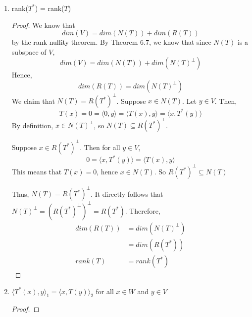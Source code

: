 \documentclass[11pt]{scrartcl}
\begin{document}
\begin{enumerate}[label=\alph*.]
{\begin{proof}
		      \begin{align*}
			      (B_{ij})^* & = \overline{B_{ji}}                         \\
			                 & =  \overline{\langle T(v_i), w_j \rangle_2} \\
			                 & =  \langle w_j, T(v_i) \rangle_2            \\
			                 & = \langle T^*(w_j), v_i \rangle_1           \\
			                 & = A_{ij}
		      \end{align*}
		      Therfore, $\left[\mathbf{T}^{*}\right]_{\gamma}^{\beta}=\left([\mathbf{T}]_{\beta}^{\gamma}\right)^{*}$.
	      \end{proof}
	      }
	\item{
	      rank($T^*$) = rank($T$)
	      \begin{proof}
		      We know that $$dim(V) = dim(N(T)) + dim(R(T))$$ by the rank nullity theorem.
		      By Theorem 6.7, we know that since $N(T)$ is a subspace of $V$, $$dim(V) = dim(N(T)) + dim(N(T)^{\perp})$$
		      Hence,
		      $$ dim(R(T)) = dim(N(T)^{\perp})$$
		      We claim that $N(T) =  R(T^*)^{\perp}$. Suppose $x \in N(T)$. Let $y \in V$. Then,
		      $$T(x) = 0 = \langle 0, y \rangle = \langle T(x), y \rangle = \langle x, T^*(y) \rangle$$
		      By definition, $x \in N(T)^{\perp}$, so $N(T) \subseteq  R(T^*)^{\perp}$.\par
		      Suppose $x \in R(T^*)^{\perp}$. Then for all $y \in V$,
		      $$0 = \langle x, T^*(y) \rangle = \langle T(x), y \rangle$$
		      This means that $T(x) = 0$, hence $x \in N(T)$. So $R(T^*)^{\perp} \subseteq N(T)$\par
		      Thus, $N(T) =  R(T^*)^{\perp}$. It directly follows that  $N(T)^{\perp} =  (R(T^*)^{\perp})^{\perp} =R (T^*) $.
		      Therefore,
		      \begin{align*}
			      dim(R(T)) & = dim(N(T)^{\perp}) \\
			                & = dim(R (T^*))      \\
			      rank(T)   & = rank(T^*)
		      \end{align*}
	      \end{proof}
	      }
	\item{
	      $\langle T^*(x), y \rangle_1 = \langle x, T(y) \rangle_2$ for all $x \in W$ and $y \in V$
	      \begin{proof}

\end{proof}}
\end{enumerate}
\end{document}
